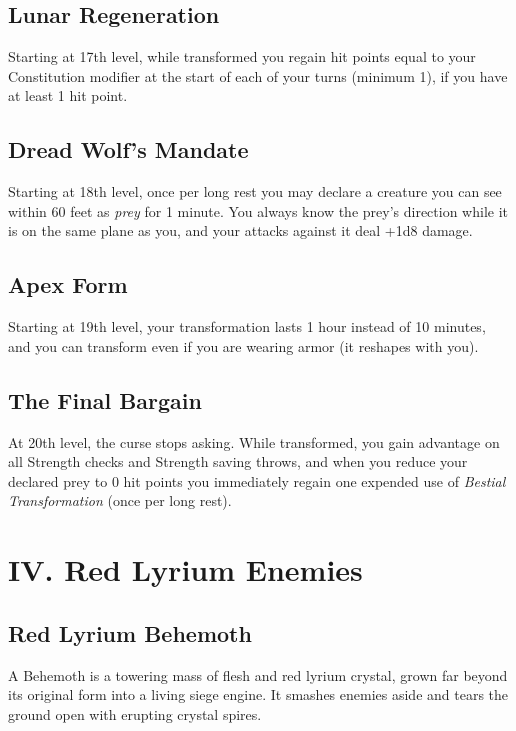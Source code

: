 \documentclass{apotheosis-book}
\begin{document}
\subsection*{Lunar Regeneration}
Starting at 17th level, while transformed you regain hit points equal to your Constitution modifier at the start of each of your turns (minimum 1), if you have at least 1 hit point.

\subsection*{Dread Wolf's Mandate}
Starting at 18th level, once per long rest you may declare a creature you can see within 60 feet as \emph{prey} for 1 minute. You always know the prey's direction while it is on the same plane as you, and your attacks against it deal +1d8 damage.

\subsection*{Apex Form}
Starting at 19th level, your transformation lasts 1 hour instead of 10 minutes, and you can transform even if you are wearing armor (it reshapes with you).

\subsection*{The Final Bargain}
At 20th level, the curse stops asking. While transformed, you gain advantage on all Strength checks and Strength saving throws, and when you reduce your declared prey to 0 hit points you immediately regain one expended use of \emph{Bestial Transformation} (once per long rest).

\newpage

\section{IV. Red Lyrium Enemies}

\subsection{Red Lyrium Behemoth}

A Behemoth is a towering mass of flesh and red lyrium crystal, grown far beyond its original form into a living siege engine. It smashes enemies aside and tears the ground open with erupting crystal spires.
\end{document}
